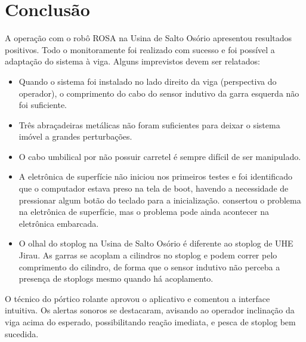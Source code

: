 \section{Conclusão}

A operação com o robô ROSA na Usina de Salto Osório apresentou resultados
positivos. Todo o monitoramente foi realizado com sucesso e foi possível a
adaptação do sistema à viga. Alguns imprevistos devem ser relatados:

\begin{itemize}
  \item Quando o sistema foi instalado no lado direito da viga (perspectiva do
  operador), o comprimento do cabo do sensor indutivo da garra esquerda não foi
  suficiente.
  \item Três abraçadeiras metálicas não foram suficientes para deixar o sistema
  imóvel a grandes perturbações.
  \item O cabo umbilical por não possuir carretel é sempre difícil de ser
  manipulado.
  \item A eletrônica de superfície não iniciou nos primeiros testes e foi
  identificado que o computador estava preso na tela de boot, havendo a
  necessidade de pressionar algum botão do teclado para a inicialização.
  \sylvain consertou o problema na eletrônica de superfície, mas o problema pode
  ainda acontecer na eletrônica embarcada.
  \item O olhal do stoplog na Usina de Salto Osório é diferente ao stoplog de
  UHE Jirau. As garras se acoplam a cilindros no stoplog e podem correr pelo
  comprimento do cilindro, de forma que o sensor indutivo não perceba a presença
  de stoplogs mesmo quando há acoplamento.
\end{itemize}

O técnico do pórtico rolante aprovou o aplicativo e comentou a interface
intuitiva. Os alertas sonoros se destacaram, avisando ao operador inclinação da
viga acima do esperado, possibilitando reação imediata, e pesca de stoplog bem
sucedida. 
